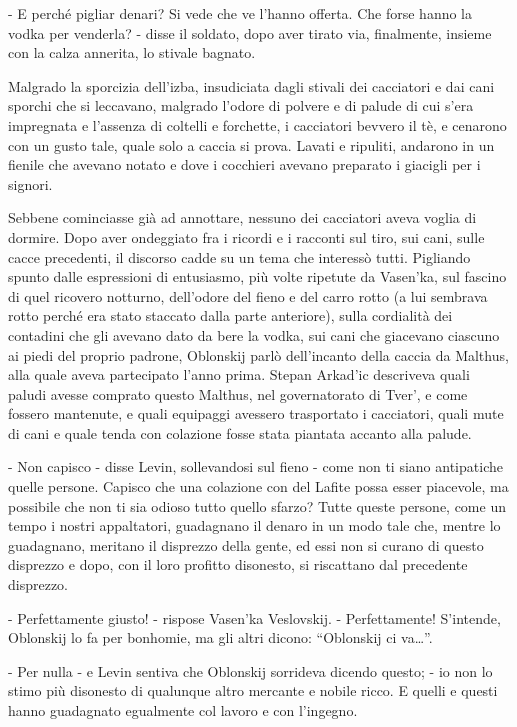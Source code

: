 - E perché pigliar denari? Si vede che ve l'hanno offerta. Che forse hanno la vodka per venderla? - disse il soldato, dopo aver tirato via, finalmente, insieme con la calza annerita, lo stivale bagnato. 

Malgrado la sporcizia dell'izba, insudiciata dagli stivali dei cacciatori e dai cani sporchi che si leccavano, malgrado l'odore di polvere e di palude di cui s'era impregnata e l'assenza di coltelli e forchette, i cacciatori bevvero il tè, e cenarono con un gusto tale, quale solo a caccia si prova. Lavati e ripuliti, andarono in un fienile che avevano notato e dove i cocchieri avevano preparato i giacigli per i signori. 

Sebbene cominciasse già ad annottare, nessuno dei cacciatori aveva voglia di dormire. Dopo aver ondeggiato fra i ricordi e i racconti sul tiro, sui cani, sulle cacce precedenti, il discorso cadde su un tema che interessò tutti. Pigliando spunto dalle espressioni di entusiasmo, più volte ripetute da Vasen'ka, sul fascino di quel ricovero notturno, dell'odore del fieno e del carro rotto (a lui sembrava rotto perché era stato staccato dalla parte anteriore), sulla cordialità dei contadini che gli avevano dato da bere la vodka, sui cani che giacevano ciascuno ai piedi del proprio padrone, Oblonskij parlò dell'incanto della caccia da Malthus, alla quale aveva partecipato l'anno prima. Stepan Arkad'ic descriveva quali paludi avesse comprato questo Malthus, nel governatorato di Tver', e come fossero mantenute, e quali equipaggi avessero trasportato i cacciatori, quali mute di cani e quale tenda con colazione fosse stata piantata accanto alla palude. 

- Non capisco - disse Levin, sollevandosi sul fieno - come non ti siano antipatiche quelle persone. Capisco che una colazione con del Lafite possa esser piacevole, ma possibile che non ti sia odioso tutto quello sfarzo? Tutte queste persone, come un tempo i nostri appaltatori, guadagnano il denaro in un modo tale che, mentre lo guadagnano, meritano il disprezzo della gente, ed essi non si curano di questo disprezzo e dopo, con il loro profitto disonesto, si riscattano dal precedente disprezzo. 

- Perfettamente giusto! - rispose Vasen'ka Veslovskij. - Perfettamente! S'intende, Oblonskij lo fa per bonhomie, ma gli altri dicono: ``Oblonskij ci va\ldots{}''. 

- Per nulla - e Levin sentiva che Oblonskij sorrideva dicendo questo; - io non lo stimo più disonesto di qualunque altro mercante e nobile ricco. E quelli e questi hanno guadagnato egualmente col lavoro e con l'ingegno. 

